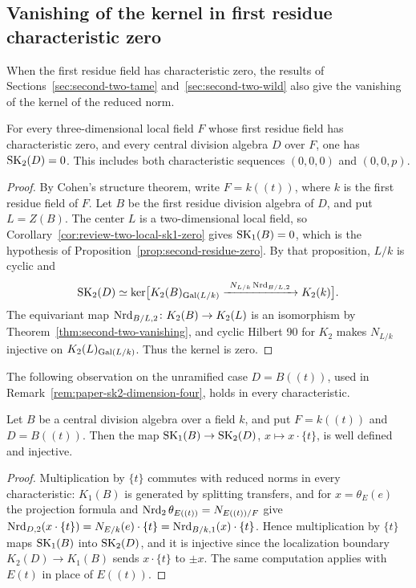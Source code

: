 \subsection{Vanishing of the kernel in first residue characteristic zero}\label{sec:second-three-charzero}
When the first residue field has characteristic zero, the results of Sections~\ref{sec:second-two-tame} and~\ref{sec:second-two-wild} also give the vanishing of the kernel of the reduced norm.

\begin{corollary}\label{cor:second-three-charzero}
For every three-dimensional local field $F$ whose first residue field has characteristic zero, and every central division algebra $D$ over $F$, one has $\operatorname{SK}_2(D)=0$.
This includes both characteristic sequences $(0,0,0)$ and $(0,0,p)$.
\end{corollary}
\begin{proof}
By Cohen's structure theorem, write $F=k((t))$, where $k$ is the first residue field of $F$.
Let $B$ be the first residue division algebra of $D$, and put $L=Z(B)$.
The center $L$ is a two-dimensional local field, so Corollary~\ref{cor:review-two-local-sk1-zero} gives $\operatorname{SK}_1(B)=0$, which is the hypothesis of Proposition~\ref{prop:second-residue-zero}.
By that proposition, $L/k$ is cyclic and
\[
 \operatorname{SK}_2(D)\simeq\ker\bigl[K_2(B)_{\operatorname{Gal}(L/k)}
  \xrightarrow{\ N_{L/k}\operatorname{Nrd}_{B/L,2}\ }K_2(k)\bigr].
\]
The equivariant map $\operatorname{Nrd}_{B/L,2}\colon K_2(B)\to K_2(L)$ is an isomorphism by Theorem~\ref{thm:second-two-vanishing}, and cyclic Hilbert 90 for $K_2$ \cite[Theorem 14.1]{MerkurjevSuslin1982} makes $N_{L/k}$ injective on $K_2(L)_{\operatorname{Gal}(L/k)}$.
Thus the kernel is zero.
\end{proof}

The following observation on the unramified case $D=B((t))$, used in Remark~\ref{rem:paper-sk2-dimension-four}, holds in every characteristic.

\begin{proposition}\label{prop:paper-laurent-sk2}
Let $B$ be a central division algebra over a field $k$, and put $F=k((t))$ and $D=B((t))$.
Then the map $\operatorname{SK}_1(B)\to\operatorname{SK}_2(D)$, $x\mapsto x\cdot\{t\}$, is well defined and injective.
\end{proposition}
\begin{proof}
Multiplication by $\{t\}$ commutes with reduced norms in every characteristic: $K_1(B)$ is generated by splitting transfers, and for $x=\theta_E(e)$ the projection formula and $\operatorname{Nrd}_2\theta_{E((t))}=N_{E((t))/F}$ give $\operatorname{Nrd}_{D,2}(x\cdot\{t\})=N_{E/k}(e)\cdot\{t\}=\operatorname{Nrd}_{B/k,1}(x)\cdot\{t\}$.
Hence multiplication by $\{t\}$ maps $\operatorname{SK}_1(B)$ into $\operatorname{SK}_2(D)$, and it is injective since the localization boundary $K_2(D)\to K_1(B)$ sends $x\cdot\{t\}$ to $\pm x$.
The same computation applies with $E(t)$ in place of $E((t))$.
\end{proof}
